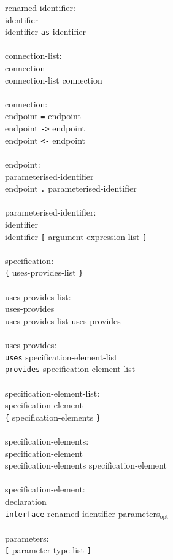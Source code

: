 \documentclass[11pt]{article}
\newcommand{\kw}[1]{{\tt #1}}
\newcommand{\opt}{$_\mbox{opt}$\xspace}
\begin{document}
{\begin{tabbing}
renamed-identifier:\\
\>	identifier\\
\>	identifier \kw{as} identifier\\
\\
connection-list:\\
\>	connection\\
\>	connection-list connection\\
\\
connection:\\
\>	endpoint \kw{=} endpoint\\
\>	endpoint \kw{->} endpoint\\
\>	endpoint \kw{<-} endpoint\\
\\
endpoint:\\
\>	parameterised-identifier\\
\>	endpoint \kw{.} parameterised-identifier\\
\\
parameterised-identifier:\\
\>	identifier\\
\>	identifier \kw{[} argument-expression-list \kw{]}\\
\\
specification:\\
\>	\kw{\{} uses-provides-list \kw{\}}\\
\\
uses-provides-list:\\
\>	uses-provides\\
\>	uses-provides-list uses-provides\\
\\
uses-provides:\\
\>	\kw{uses} specification-element-list\\
\>	\kw{provides} specification-element-list\\
\\
specification-element-list:\\
\>	specification-element\\
\>	\kw{\{} specification-elements \kw{\}}\\
\\
specification-elements:\\
\>	specification-element\\
\>	specification-elements specification-element\\
\\
specification-element:\\
\>	declaration\\
\>	\kw{interface} renamed-identifier parameters\opt\\
\\
parameters:\\
\>	\kw{[} parameter-type-list \kw{]}
\end{tabbing}}
\end{document}
